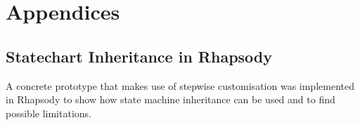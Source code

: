 \appendix

\section*{Appendices}
\renewcommand{\thesubsection}{\Alph{subsection}}

\label{annex:framework}

\subsection{Statechart Inheritance in Rhapsody\label{annex:proto_inheritance}}

A concrete prototype that makes use of stepwise customisation was implemented in Rhapsody to
show how state machine inheritance can be used and to find possible limitations.
